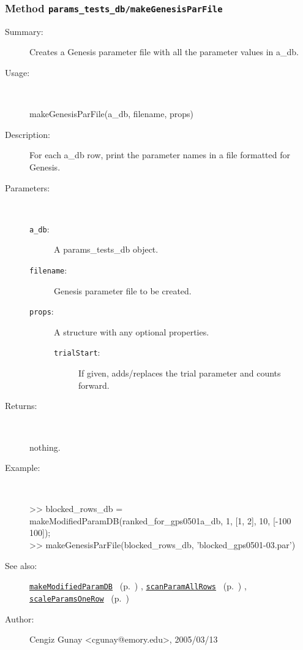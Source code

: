 \subsubsection[Method \texttt{makeGenesisParFile}]{Method \texttt{params\_tests\_db/makeGenesisParFile}}%
%
\label{ref_params_tests_db__makeGenesisParFile}%
\hypertarget{ref_params_tests_db__makeGenesisParFile}{}%
\begin{description}
\item[Summary:]Creates a Genesis parameter file with all the parameter values in a\_db.
%
\item[Usage:]~%
\begin{lyxcode}%
makeGenesisParFile(a\_db, filename, props)
%
\end{lyxcode}%
%
\item[Description:]%
For each a\_db row, print the parameter names in a
 file formatted for Genesis.
\item[Parameters:]~
\begin{description}%
\item[\texttt{a\_db}:]
 A params\_tests\_db object.
\item[\texttt{filename}:]
 Genesis parameter file to be created.
\item[\texttt{props}:]
 A structure with any optional properties.
\begin{description}%
\item[\texttt{trialStart}:]
 If given, adds/replaces the trial parameter and counts forward.
\end{description}%
\end{description}%
%
\item[Returns:]~

	nothing.
%
\item[Example:]~
\begin{lyxcode}>> blocked\_rows\_db = makeModifiedParamDB(ranked\_for\_gps0501a\_db, 1, [1, 2], 10, [-100 100]);\\%
>> makeGenesisParFile(blocked\_rows\_db, 'blocked\_gps0501-03.par')\\%
\end{lyxcode}
%
\item[See also:]%
\hyperlink{ref_makeModifiedParamDB}{\texttt{makeModifiedParamDB}}%
\ (p.~\pageref{ref_makeModifiedParamDB})%
%
, \hyperlink{ref_scanParamAllRows}{\texttt{scanParamAllRows}}%
\ (p.~\pageref{ref_scanParamAllRows})%
%
, \hyperlink{ref_scaleParamsOneRow}{\texttt{scaleParamsOneRow}}%
\ (p.~\pageref{ref_scaleParamsOneRow})%
%
%
\item[Author:]%
Cengiz Gunay <cgunay@emory.edu>, 2005/03/13%
\end{description}
\methodline%
